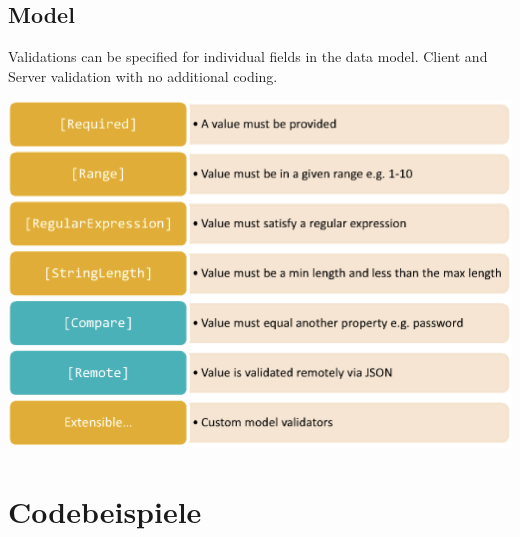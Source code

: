 \documentclass[10pt]{article}
\begin{document}
\subsection{Model}
Validations can be specified for individual fields in the data model. Client and Server validation with no additional coding.	
\begin{center}
	\includegraphics[scale=0.2]{mvc_model.png}
\end{center}

\section{Codebeispiele}
\end{document}
